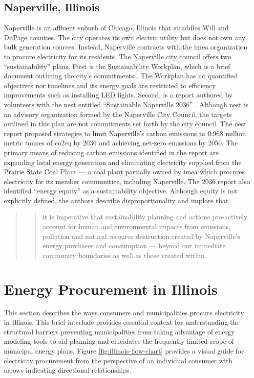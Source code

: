 \subsection{Naperville, Illinois}
Naperville is an affluent suburb of Chicago, Illinois that straddles Will and
DuPage counties. The city operates its own electric utility but does not own any
bulk generation sources. Instead, Naperville contracts with the \ac{imea}
organization to procure electricity for its residents. The Naperville city
council offers two ``sustainability'' plans. First is the Sustainability
Workplan, which is a brief document outlining the city's commitments
\cite{mjolness_city_2025}. The Workplan has no quantified objectives nor
timelines and its energy goals are restricted to efficiency improvements such as
installing LED lights. Second, is a report authored by volunteers with the
\acf{nest} entitled ``Sustainable Naperville 2036''
\cite{trendler_sustainable_2021}. Although \ac{nest} is an advisory organization
formed by the Naperville City Council, the targets outlined in this plan are not
commitments set forth by the city council. The \ac{nest} report proposed
strategies to limit Naperville's carbon emissions to 0.968 million metric tonnes
of \ac{co2eq} by 2036 and achieving net-zero emissions by 2050. The primary
means of reducing carbon emissions identified in the report are expanding local
energy generation and eliminating electricity supplied from the Prairie State
Coal Plant --- a coal plant partially owned by \ac{imea} which procures
electricity for its member communities, including Naperville. The 2036 report
also identified ``energy equity'' as a sustainability objective. Although equity
is not explicitly defined, the authors describe disproportionality and implore
that
\begin{quote}
    \blockcquote[11]{trendler_sustainable_2021}{it is imperative that
    sustainability planning and actions pro-actively account for human and
    environmental  
    impacts from emissions, pollution and natural resource destruction created
    by Naperville's energy purchases and  consumption --- beyond our immediate
    community boundaries as well as those created within.}
\end{quote}

\section{Energy Procurement in Illinois}

This section describes the ways consumers and municipalities procure electricity
in Illinois. This brief interlude provides essential context for understanding
the structural barriers preventing municipalities from taking advantage of
energy modeling tools to aid planning and elucidates the frequently limited
scope of municipal energy plans. Figure \ref{fig:illinois-flow-chart} provides a
visual guide for electricity procurement from the perspective of an individual
consumer with arrows indicating directional relationships.

